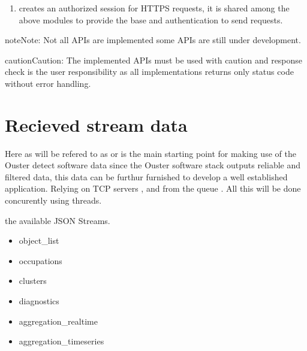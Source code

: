 \documentclass[letterpaper,10pt,english]{sphinxmanual}
\begin{document}
\begin{enumerate}
\begin{description}
\end{description}

\item {} \begin{description}
\sphinxAtStartPar
creates an authorized session for HTTPS requests, it is shared among the above modules to provide the base  and authentication to send requests.

\end{description}

\end{enumerate}

\begin{sphinxadmonition}{note}{Note:}
\sphinxAtStartPar
Not all APIs are implemented some APIs are still under development.
\end{sphinxadmonition}

\begin{sphinxadmonition}{caution}{Caution:}
\sphinxAtStartPar
The implemented APIs must be used with caution and response check is the user responsibility as all implementations returns only status code without error handling.
\end{sphinxadmonition}


\section{Recieved stream data}
\label{\detokenize{projectdoc:recieved-stream-data}}
\sphinxAtStartPar
Here as will be refered to as  or  is the main starting point for making use of the Ouster detect software data since the Ouster software stack outputs
reliable and filtered data, this data can be furthur furnished to develop a well established application. Relying on TCP servers ,  and
from the queue . All this will be done concurently using threads.

\sphinxAtStartPar
the available JSON Streams.
\begin{itemize}
\item {} 
\sphinxAtStartPar
object\_list

\item {} 
\sphinxAtStartPar
occupations

\item {} 
\sphinxAtStartPar
clusters

\item {} 
\sphinxAtStartPar
diagnostics

\item {} 
\sphinxAtStartPar
aggregation\_realtime

\item {} 
\sphinxAtStartPar
aggregation\_timeseries

\end{itemize}
\end{document}

